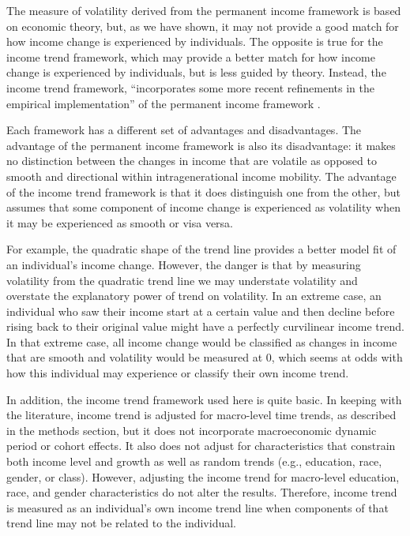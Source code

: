 \documentclass[12pt]{article}
\begin{document}
The measure of volatility derived from the permanent income framework is based on economic theory, but, as we have shown, it may not provide a good match for how income change is experienced by individuals. The opposite is true for the income trend framework, which may provide a better match for how income change is experienced by individuals, but is less guided by theory. Instead, the income trend framework, ``incorporates some more recent refinements in the empirical implementation'' of the permanent income framework \citep{gangl_2005}.

Each framework has a different set of advantages and disadvantages. The advantage of the permanent income framework is also its disadvantage: it makes no distinction between the changes in income that are volatile as opposed to smooth and directional within intragenerational income mobility. The advantage of the income trend framework is that it does distinguish one from the other, but assumes that some component of income change is experienced as volatility when it may be experienced as smooth or visa versa.

For example, the quadratic shape of the trend line provides a better model fit of an individual's income change. However, the danger is that by measuring volatility from the quadratic trend line we may understate volatility and overstate the explanatory power of trend on volatility. In an extreme case, an individual who saw their income start at a certain value and then decline before rising back to their original value might have a perfectly curvilinear income trend. In that extreme case, all income change would be classified as changes in income that are smooth and volatility would be measured at 0, which seems at odds with how this individual may experience or classify their own income trend.

In addition, the income trend framework used here is quite basic. In keeping with the literature, income trend is adjusted for macro-level time trends, as described in the methods section, but it does not incorporate macroeconomic dynamic period or cohort effects. It also does not adjust for characteristics that constrain both income level and growth as well as random trends (e.g., education, race, gender, or class). However, adjusting the income trend for macro-level education, race, and gender characteristics do not alter the results. Therefore, income trend is measured as an individual's own income trend line when components of that trend line may not be related to the individual.
\end{document}
